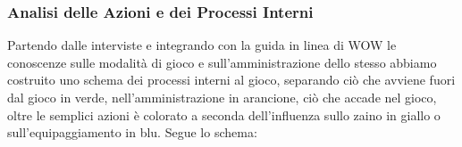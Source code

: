 
\subsubsection{Analisi delle Azioni e dei Processi Interni}

Partendo dalle interviste e integrando con la guida in linea di WOW le conoscenze sulle modalit\`{a} di gioco e sull'amministrazione dello stesso abbiamo costruito uno schema dei processi interni al gioco, separando ci\`{o} che avviene fuori dal gioco in verde, nell'amministrazione in arancione, ci\`{o} che accade nel gioco, oltre le semplici azioni \`{e} colorato a seconda dell'influenza sullo zaino in giallo o sull'equipaggiamento in blu.
Segue lo schema:


\newpage

\begin{landscape} %




\end{landscape}

 